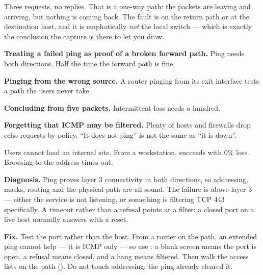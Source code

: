 Three requests, no replies. That is a one-way path: the packets are leaving and
arriving, but nothing is coming back. The fault is on the return path or at the
destination host, and it is emphatically \emph{not} the local switch --- which is
exactly the conclusion the capture is there to let you draw.

\begin{pitfall}
\begin{tight}
  \item \textbf{Treating a failed ping as proof of a broken forward path.} Ping
        needs both directions. Half the time the forward path is fine.
  \item \textbf{Pinging from the wrong source.} A router pinging from its exit
        interface tests a path the users never take.
  \item \textbf{Concluding from five packets.} Intermittent loss needs a hundred.
  \item \textbf{Forgetting that ICMP may be filtered.} Plenty of hosts and
        firewalls drop echo requests by policy. ``It does not ping'' is not the
        same as ``it is down''.
\end{tight}
\end{pitfall}

\begin{breakfix}
Users cannot load an internal site. From a workstation, 
succeeds with 0\% loss. Browsing to the address times out.

\textbf{Diagnosis.} Ping proves layer 3 connectivity in both directions, so
addressing, masks, routing and the physical path are all sound. The failure is
above layer 3 --- either the service is not listening, or something is filtering
TCP 443 specifically. A timeout rather than a refusal points at a filter: a
closed port on a live host normally answers with a reset.

\textbf{Fix.} Test the port rather than the host. From a router on the path, an
extended ping cannot help --- it is ICMP only --- so use : a blank screen means the port is open, a refusal means closed, and a hang
means filtered. Then walk the access lists on the path (). Do not
touch addressing; the ping already cleared it.
\end{breakfix}

